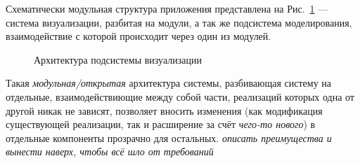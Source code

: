 \documentclass[a4paper,12pt]{extarticle}
\begin{document}
Схематически модульная структура приложения представлена на Рис.~\ref{ris:architecture-all} --- система визуализации, разбитая на модули, а так же подсистема моделирования, взаимодействие с которой происходит через один из модулей.

\begin{figure}[h]
    \caption{Архитектура подсистемы визуализации}
    \label{ris:architecture-all}
\end{figure}

Такая \textit{модульная/открытая} архитектура системы, разбивающая систему на отдельные, взаимодействиющие между собой части, реализаций которых одна от другой никак не зависят, позволяет вносить изменения (как модификация существующей реализации, так и расширение за счёт \textit{чего-то нового}) в отдельные компоненты прозрачно для остальных. \textit{описать преимущества и вынести наверх, чтобы всё шло от требований}
\end{document}
